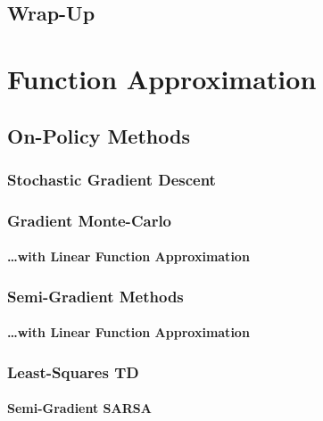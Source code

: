 	\section{Wrap-Up} %

\chapter{Function Approximation} %

	\section{On-Policy Methods} %

		\subsection{Stochastic Gradient Descent} %

		\subsection{Gradient Monte-Carlo} %

			\subsubsection{\dots with Linear Function Approximation} %

		\subsection{Semi-Gradient Methods} %

			\subsubsection{\dots with Linear Function Approximation} %

		\subsection{Least-Squares TD} %

			\subsubsection{Semi-Gradient SARSA} %

